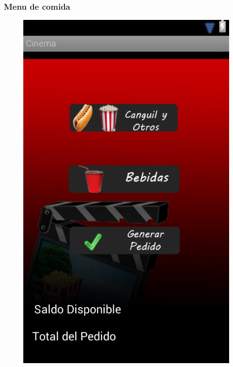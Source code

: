 \documentclass{beamer}
\begin{document}
\begin{frame}[allowframbreaks]
\frametitle{Menu de comida}
\begin{figure}[h]
\centering
\includegraphics[height=0.8\textheight]{menucompra.png}
\end{figure}
\end{frame}
\end{document}
